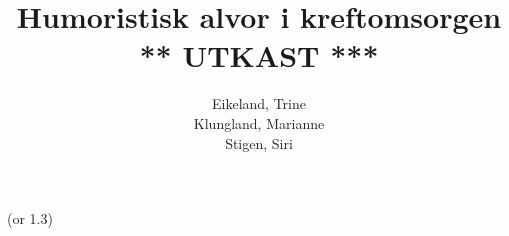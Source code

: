 \documentclass[a4paper,norsk,12pt,twoside]{report}
\begin{document}
  \author{Eikeland, Trine\\Klungland, Marianne\\Stigen, Siri}
  \title{Humoristisk alvor i kreftomsorgen \\
    {\Huge{\sffamily *** UTKAST ***}}}

  \maketitle
  \begin{abstract}
  
  \end{abstract}

  \tableofcontents

  \clearpage

  \renewcommand{\arraystretch}{1.2} (or 1.3)

  
  
  
  
  
  
  
  \clearpage

  \begingroup %
  \raggedright %
  \nocite{*} %
  
  \endgroup %

  \appendix
  
  \clearpage %
  \printindex
\end{document}
